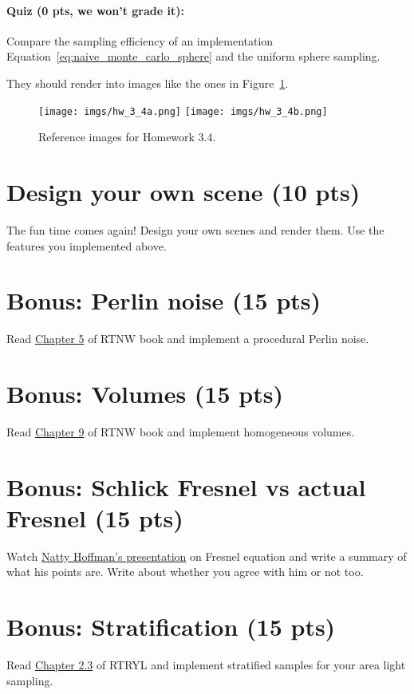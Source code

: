 \paragraph{Quiz (0 pts, we won't grade it):} Compare the sampling efficiency of an implementation Equation~\eqref{eq:naive_monte_carlo_sphere} and the uniform sphere sampling.

They should render into images like the ones in Figure~\ref{fig:hw_3_4}. 

\begin{figure}[ht]
    \centering
    \texttt{[image: imgs/hw\_3\_4a.png]}
    \texttt{[image: imgs/hw\_3\_4b.png]}
    \caption{Reference images for Homework 3.4.}
    \label{fig:hw_3_4}
\end{figure}

\section{Design your own scene (10 pts)}
The fun time comes again! Design your own scenes and render them. Use the features you implemented above.

\section{Bonus: Perlin noise (15 pts)}
Read \href{https://raytracing.github.io/books/RayTracingTheNextWeek.html#perlinnoise}{Chapter 5} of RTNW book and implement a procedural Perlin noise.

\section{Bonus: Volumes (15 pts)}
Read \href{https://raytracing.github.io/books/RayTracingTheNextWeek.html#volumes}{Chapter 9} of RTNW book and implement homogeneous volumes.

\section{Bonus: Schlick Fresnel vs actual Fresnel (15 pts)}
Watch \href{https://www.youtube.com/watch?v=kEcDbl7eS0w}{Natty Hoffman's presentation} on Fresnel equation and write a summary of what his points are. Write about whether you agree with him or not too.

\section{Bonus: Stratification (15 pts)}
Read \href{https://raytracing.github.io/books/RayTracingTheRestOfYourLife.html#asimplemontecarloprogram/stratifiedsamples(jittering)}{Chapter 2.3} of RTRYL and implement stratified samples for your area light sampling.

